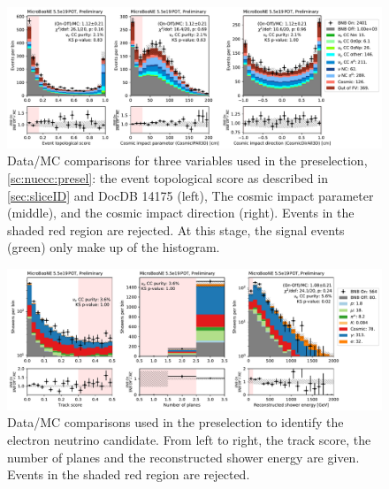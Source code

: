 \begin{figure}[htb]
\begin{center}
\includegraphics[height=0.27\textheight]{NueCCsel/Images/datamc/presel_1.pdf}
\caption{Data/MC comparisons for three variables used in the \nuecc preselection, \cref{sc:nuecc:presel}: the event topological score as described in \cref{sec:sliceID} and DocDB 14175 (left), The cosmic impact parameter (middle), and the cosmic impact direction (right). Events in the shaded red region are rejected. At this stage, the signal \nuecc events (green) only make up  of the histogram.}
\label{fig:nuecc:presel_1}
\end{center}
\end{figure}


\begin{figure}[htb]
\begin{center}
\includegraphics[height=0.27\textheight]{NueCCsel/Images/datamc/presel_2.pdf}
\caption{Data/MC comparisons used in the preselection to identify the electron neutrino candidate. From left to right, the track score, the number of planes and the reconstructed shower energy are given. Events in the shaded red region are rejected.}
\label{fig:nuecc:presel_2}
\end{center}
\end{figure}

